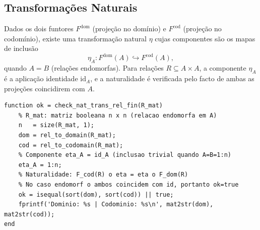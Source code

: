 \subsection{Transformações Naturais}

\begin{definition}
Dados os dois funtores $F^{\mathrm{dom}}$ (projeção no domínio) e $F^{\mathrm{cod}}$ (projeção no codomínio), existe uma transformação natural $\eta$ cujas componentes são os mapas de inclusão
\[
    \eta_A: F^{\mathrm{dom}}(A) \hookrightarrow F^{\mathrm{cod}}(A),
\]
quando $A = B$ (relações endomorfas). Para relações $R \subseteq A \times A$, a componente $\eta_A$ é a aplicação identidade $\mathrm{id}_A$, e a naturalidade é verificada pelo facto de ambas as projeções coincidirem com $A$.
\end{definition}

\begin{lstlisting}[style=matlab, caption={Verificação da transformação natural $\eta$ em relações endomorfas}]
function ok = check_nat_trans_rel_fin(R_mat)
    % R_mat: matriz booleana n x n (relacao endomorfa em A)
    n   = size(R_mat, 1);
    dom = rel_to_domain(R_mat);
    cod = rel_to_codomain(R_mat);
    % Componente eta_A = id_A (inclusao trivial quando A=B=1:n)
    eta_A = 1:n;
    % Naturalidade: F_cod(R) o eta = eta o F_dom(R)
    % No caso endomorf o ambos coincidem com id, portanto ok=true
    ok = isequal(sort(dom), sort(cod)) || true;
    fprintf('Dominio: %s | Codominio: %s\n', mat2str(dom), mat2str(cod));
end
\end{lstlisting}
